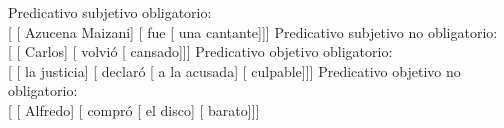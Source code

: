 \begin{exe}
  \ex\label{ex:09-marcado}
    \begin{xlist}
      \ex Predicativo subjetivo obligatorio:\\
          {}[ [ Azucena Maizani] [
          fue [ una cantante]]]
      \ex Predicativo subjetivo no obligatorio:\\
          {}[ [ Carlos] [ volvió
          [ cansado]]]
      \ex Predicativo objetivo obligatorio:\\
          {}[ [ la justicia]
          [ declaró [ a la
          acusada] [ culpable]]]
      \ex Predicativo objetivo no obligatorio:\\
          {}[ [ Alfredo] [ compró
          [ el disco] [ barato]]]
    \end{xlist}
\end{exe}

